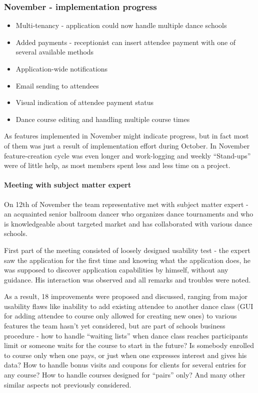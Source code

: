 \documentclass{article}
\begin{document}
\subsubsection{November - implementation progress}
\begin{itemize}
\item Multi-tenancy - application could now handle multiple dance schools 
\item Added payments - receptionist can insert attendee payment with one of several available methods
\item Application-wide notifications
\item Email sending to attendees
\item Visual indication of attendee payment status
\item Dance course editing and handling multiple course times
\end{itemize}
As features implemented in November might indicate progress, but in fact most of them was just a result of implementation effort during October. In November feature-creation cycle was even longer and work-logging and weekly ``Stand-ups'' were of little help, as most members spent less and less time on a project.

\paragraph{Meeting with subject matter expert}
On 12th of November the team representative met with subject matter expert - an acquainted senior ballroom dancer who organizes dance tournaments and who is knowledgeable about targeted market and has collaborated with various dance schools. 

First part of the meeting consisted of loosely designed usability test - the expert saw the application for the first time and knowing what the application does, he was supposed to discover application capabilities by himself, without any guidance. His interaction was observed and all remarks and troubles were noted.

As a result, 18 improvements were proposed and discussed, ranging from major usability flaws like inability to add existing attendee to another dance class (GUI for adding attendee to course only allowed for creating new ones) to various features the team hasn't yet considered, but are part of schools business procedure - how to handle ``waiting lists'' when dance class reaches participants limit or someone waits for the course to start in the future? Is somebody enrolled to course only when one pays, or just when one expresses interest and gives his data? How to handle bonus visits and coupons for clients for several entries for any course? How to handle courses designed for ``pairs'' only? And many other similar aspects not previously considered.
\end{document}
